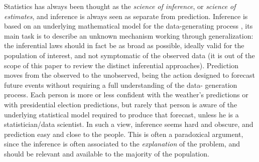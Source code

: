 \documentclass{statsoc}
\begin{document}
Statistics has always been thought as the \emph{science of inference}, or \emph{science of estimates}, and inference is always seen as separate from prediction. Inference is based on 
an underlying mathematical model for the data-generating process \citep{bzdok2018points}, its main task is to describe an unknown mechanism working through generalization: the 
inferential laws should in fact be as broad as possible, ideally valid for the population of interest, and not symptomatic of the observed data (it is out of the scope of this paper to review the distinct inferential 
approaches). Prediction moves from the observed to the unobserved, being the action designed to forecast future events without requiring a full understanding of the data-
generation process. Each person is more or less confident with the weather's predictions or with presidential election predictions, but rarely that person is aware of the underlying 
statistical model required to produce that forecast, unless he is a statistician/data scientist. In such a view, inference seems hard and obscure, and prediction easy and close 
to the people. This is often a paradoxical argument, since the inference is often associated to the \emph{explanation} of the problem, and should be relevant and available to the majority of the population.
\end{document}
